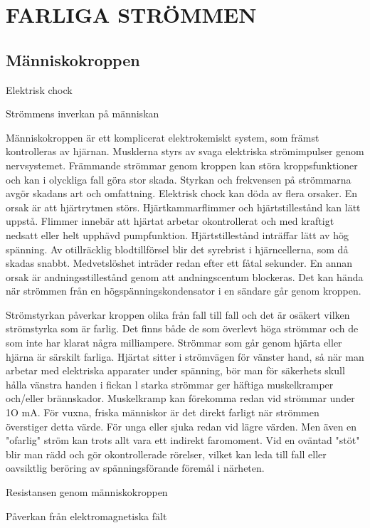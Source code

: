 \chapter{FARLIGA STRÖMMEN}

\section{Människokroppen}

Elektrisk chock

Strömmens inverkan på människan

Människokroppen är ett komplicerat elektrokemiskt system, som främst kontrolleras av
hjärnan. Musklerna styrs av svaga elektriska
strömimpulser genom nervsystemet. Främmande strömmar genom kroppen kan störa
kroppsfunktioner och kan i olyckliga fall göra
stor skada. Styrkan och frekvensen på strömmarna avgör skadans art och omfattning.
Elektrisk chock kan döda av flera orsaker.
En orsak är att hjärtrytmen störs. Hjärtkammarflimmer och hjärtstillestånd kan lätt
uppstå. Flimmer innebär att hjärtat arbetar
okontrollerat och med kraftigt nedsatt eller
helt upphävd pumpfunktion. Hjärtstillestånd
inträffar lätt av hög spänning. Av otillräcklig
blodtillförsel blir det syrebrist i hjärncellerna,
som då skadas snabbt. Medvetslöshet inträder redan efter ett fåtal sekunder.
En annan orsak är andningsstillestånd
genom att andningscentum blockeras. Det
kan hända när strömmen från en högspänningskondensator i en sändare går genom
kroppen.

Strömstyrkan påverkar kroppen olika från
fall till fall och det är osäkert vilken strömstyrka som är farlig. Det finns både de som
överlevt höga strömmar och de som inte har
klarat några milliampere. Strömmar som går
genom hjärta eller hjärna är särskilt farliga.
Hjärtat sitter i strömvägen för vänster hand,
så när man arbetar med elektriska apparater
under spänning, bör man för säkerhets skull
hålla vänstra handen i fickan l
starka strömmar ger häftiga muskelkramper och/eller brännskador. Muskelkramp kan
förekomma redan vid strömmar under 1O
mA. För vuxna, friska människor är det direkt
farligt när strömmen överstiger detta värde.
För unga eller sjuka redan vid lägre värden.
Men även en "ofarlig" ström kan trots allt
vara ett indirekt faromoment. Vid en oväntad
"stöt" blir man rädd och gör okontrollerade
rörelser, vilket kan leda till fall eller oavsiktlig
beröring av spänningsförande föremål i närheten.

Resistansen genom människokroppen

Påverkan från elektromagnetiska fält

